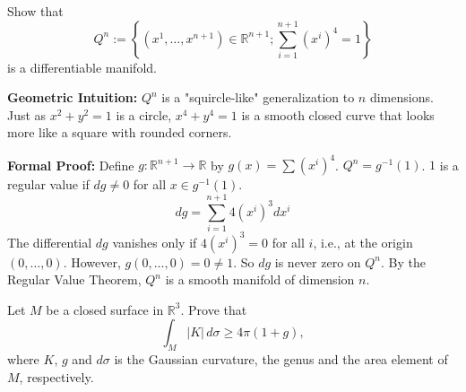 \begin{exercise}
\label{geometry:2018:10}
Show that
\[
Q^{n} := \left\{(x^{1}, \dots, x^{n+1}) \in \mathbb{R}^{n+1}; \sum_{i=1}^{n+1} (x^{i})^{4} = 1 \right\}
\]
is a differentiable manifold.
\end{exercise}

\begin{solution}
\textbf{Geometric Intuition:}
$Q^n$ is a "squircle-like" generalization to $n$ dimensions. Just as $x^2+y^2=1$ is a circle, $x^4+y^4=1$ is a smooth closed curve that looks more like a square with rounded corners.

\textbf{Formal Proof:}
Define $g: \mathbb{R}^{n+1} \to \mathbb{R}$ by $g(x) = \sum (x^i)^4$. $Q^n = g^{-1}(1)$.
$1$ is a regular value if $dg \neq 0$ for all $x \in g^{-1}(1)$.
\[
dg = \sum_{i=1}^{n+1} 4(x^i)^3 dx^i
\]
The differential $dg$ vanishes only if $4(x^i)^3 = 0$ for all $i$, i.e., at the origin $(0, \dots, 0)$.
However, $g(0, \dots, 0) = 0 \neq 1$. So $dg$ is never zero on $Q^n$.
By the Regular Value Theorem, $Q^n$ is a smooth manifold of dimension $n$.
\end{solution}

\begin{exercise}
\label{geometry:2018:11}
Let $M$ be a closed surface in $\mathbb{R}^{3}$. Prove that
\[
\int_{M} |K|\, d\sigma \geq 4\pi(1 + g),
\]
where $K$, $g$ and $d\sigma$ is the Gaussian curvature, the genus and the area element of $M$, respectively.
\end{exercise}

